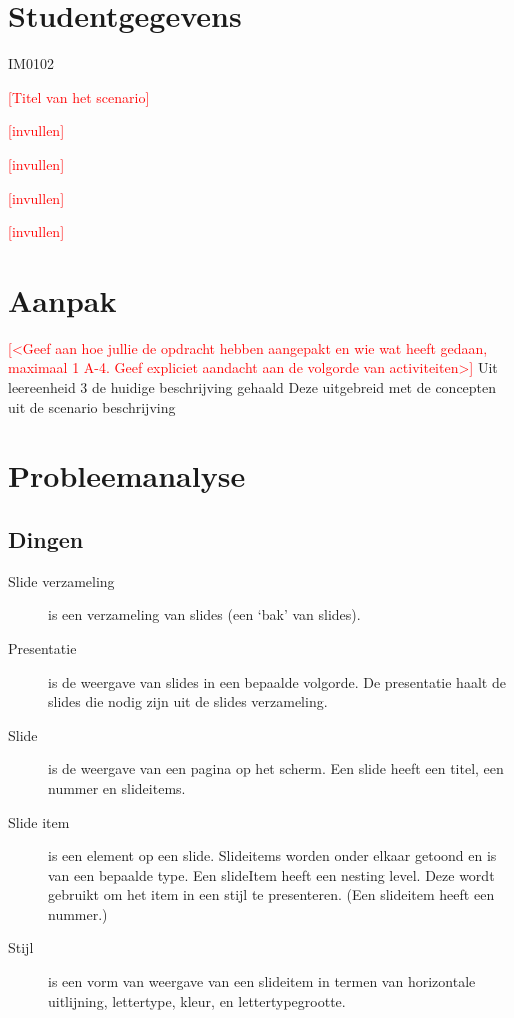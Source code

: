 \documentclass[a4paper]{article}
\newcommand{\todo}[1]{\textcolor{red}{[#1]}}
\begin{document}
\pagestyle{fancy}

\section*{Studentgegevens}
\begin{description}
	\item [Cursuscode] IM0102
	\item \todo{Titel van het scenario}
	\item [Naam] \todo{invullen}
	\item [Studentnummer] \todo{invullen}
	\item [Naam] \todo{invullen}
	\item [Studentnummer] \todo{invullen}
\end{description}

\section*{Aanpak}
\todo{<Geef aan hoe jullie de opdracht hebben aangepakt en wie wat heeft gedaan, maximaal 1 A-4. Geef expliciet aandacht aan de volgorde van activiteiten>}
Uit leereenheid 3 de huidige beschrijving gehaald
Deze uitgebreid met de concepten uit de scenario beschrijving



\section{Probleemanalyse}
\subsection{Dingen}
\begin{description}
\item[Slide verzameling] is een verzameling van slides (een ‘bak’ van slides).
\item[Presentatie] is de weergave van slides in een bepaalde volgorde. De presentatie haalt de slides die nodig zijn uit de slides verzameling.
\item[Slide] is de weergave van een pagina op het scherm.
Een slide heeft een titel, een nummer en slideitems.
\item[Slide item] is een element op een slide. Slideitems worden onder elkaar getoond en is van een bepaalde type.
Een slideItem heeft een nesting level. Deze wordt gebruikt om het item in een stijl te presenteren. (Een slideitem heeft een nummer.)
\item[Stijl] is een vorm van weergave van een slideitem in termen van horizontale uitlijning, lettertype, kleur, en lettertypegrootte.
\end{description}
\end{document}
